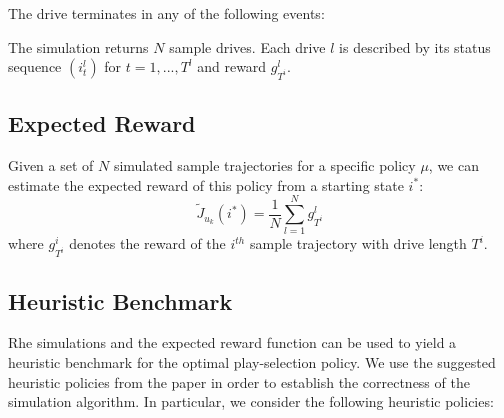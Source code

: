 \documentclass[11pt, oneside]{article}   	%
\begin{document}
The drive terminates in any of the following events:

The simulation returns $N$ sample drives. Each drive $l$ is described by its status sequence $(i_t^l)$ for $t=1,...,T^l$ and reward $g_{T^i}^l$.

\subsection{Expected Reward}
Given a set of $N$ simulated sample trajectories for a specific policy $\mu$, we can estimate the expected reward of this policy from a starting state $i^*$:
$$
\widetilde{J}_{u_k}(i^*) = \frac{1}{N}\sum_{l=1}^N g_{T^i}^l
$$
where $g_{T^i}^i$ denotes the reward of the $i^{th}$ sample trajectory with drive length $T^i$.

\subsection{Heuristic Benchmark}
Rhe simulations and the expected reward function can be used to yield a heuristic benchmark for the optimal play-selection policy. We use the suggested heuristic policies from the paper in order to establish the correctness of the simulation algorithm. In particular, we consider the following heuristic policies:
\end{document}
